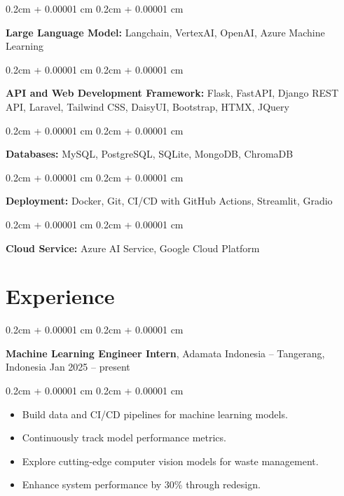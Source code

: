 \documentclass[10pt, a4paper]{article}
\newenvironment{highlights}{
    \begin{itemize}[
        topsep=0cm,
        parsep=0cm,
        partopsep=0pt,
        itemsep=0pt,
        leftmargin=0cm + 10pt
    ]
}{
    \end{itemize}
} %
\newenvironment{onecolentry}{
    \begin{adjustwidth}{
        0.2cm + 0.00001 cm
    }{
        0.2cm + 0.00001 cm
    }
}{
    \end{adjustwidth}
} %
\newenvironment{twocolentry}[2][]{
    \onecolentry
    \def\secondColumn{#2}
    \setcolumnwidth{\fill, 4.5cm}
    \begin{paracol}{2}
}{
    \switchcolumn \raggedleft \secondColumn
    \end{paracol}
    \endonecolentry
} %
\begin{document}
        \vspace{0.1cm}

        \begin{onecolentry}
            \textbf{Large Language Model:} Langchain, VertexAI, OpenAI, Azure Machine Learning
        \end{onecolentry}

        \vspace{0.1cm}

        \begin{onecolentry}
            \textbf{API and Web Development Framework:} Flask, FastAPI, Django REST API, Laravel, Tailwind CSS, DaisyUI, Bootstrap, HTMX, JQuery
        \end{onecolentry}

        \vspace{0.1cm}

        \begin{onecolentry}
            \textbf{Databases:} MySQL, PostgreSQL, SQLite, MongoDB, ChromaDB
        \end{onecolentry}

        \vspace{0.1cm}

        \begin{onecolentry}
            \textbf{Deployment:} Docker, Git, CI/CD with GitHub Actions, Streamlit, Gradio
        \end{onecolentry}

        \vspace{0.1cm}

        \begin{onecolentry}
            \textbf{Cloud Service:} Azure AI Service, Google Cloud Platform
        \end{onecolentry}


    
    \section{Experience}



        
        \begin{twocolentry}{
            Jan 2025 – present
        }
            \textbf{Machine Learning Engineer Intern}, Adamata Indonesia -- Tangerang, Indonesia\end{twocolentry}

        \vspace{0cm}
        \begin{onecolentry}
            \begin{highlights}
                \item Build data and CI/CD pipelines for machine learning models.
                \item Continuously track model performance metrics.
                \item Explore cutting-edge computer vision models for waste management.
                \item Enhance system performance by 30\% through redesign.
            \end{highlights}
        \end{onecolentry}
\end{document}
